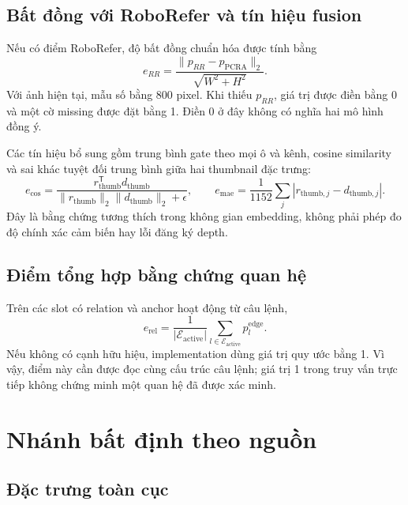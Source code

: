 \subsection{Bất đồng với RoboRefer và tín hiệu fusion}

Nếu có điểm RoboRefer, độ bất đồng chuẩn hóa được tính bằng
\begin{equation}
    e_{RR}=
    \frac{\|p_{RR}-p_{\mathrm{PCRA}}\|_2}
    {\sqrt{W^2+H^2}}.
\end{equation}
Với ảnh hiện tại, mẫu số bằng 800 pixel.
Khi thiếu $p_{RR}$, giá trị được điền bằng 0 và một cờ missing
được đặt bằng 1. Điền 0 ở đây không có nghĩa hai mô hình đồng ý.

Các tín hiệu bổ sung gồm trung bình gate theo mọi ô và kênh,
cosine similarity và sai khác tuyệt đối trung bình giữa hai
thumbnail đặc trưng:
\begin{equation}
    e_{\mathrm{cos}}=
    \frac{r_{\mathrm{thumb}}^{\mathsf T}d_{\mathrm{thumb}}}
    {\|r_{\mathrm{thumb}}\|_2\|d_{\mathrm{thumb}}\|_2+\epsilon},
    \qquad
    e_{\mathrm{mae}}=\frac{1}{1152}
    \sum_j|r_{\mathrm{thumb},j}-d_{\mathrm{thumb},j}|.
\end{equation}
Đây là bằng chứng tương thích trong không gian embedding, không
phải phép đo độ chính xác cảm biến hay lỗi đăng ký depth.

\subsection{Điểm tổng hợp bằng chứng quan hệ}

Trên các slot có relation và anchor hoạt động từ câu lệnh,
\begin{equation}
    e_{\mathrm{rel}}=
    \frac{1}{|\mathcal{E}_{\mathrm{active}}|}
    \sum_{l\in\mathcal{E}_{\mathrm{active}}}p_l^{\mathrm{edge}}.
\end{equation}
Nếu không có cạnh hữu hiệu, implementation dùng giá trị quy ước
bằng 1. Vì vậy, điểm này cần được đọc cùng cấu trúc câu lệnh;
giá trị 1 trong truy vấn trực tiếp không chứng minh một quan hệ
đã được xác minh.

\section{Nhánh bất định theo nguồn}
\label{sec:method-source-head}

\subsection{Đặc trưng toàn cục}

